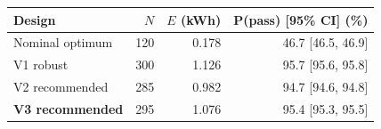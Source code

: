 \begin{tabular}{lrrr}
\toprule
Design & $N$ & $E$ (kWh) & P(pass) [95\% CI] (\%) \\
\midrule
Nominal optimum & 120 & 0.178 & 46.7 [46.5, 46.9] \\
V1 robust & 300 & 1.126 & 95.7 [95.6, 95.8] \\
V2 recommended & 285 & 0.982 & 94.7 [94.6, 94.8] \\
\textbf{V3 recommended} & 295 & 1.076 & 95.4 [95.3, 95.5] \\
\bottomrule
\end{tabular}

